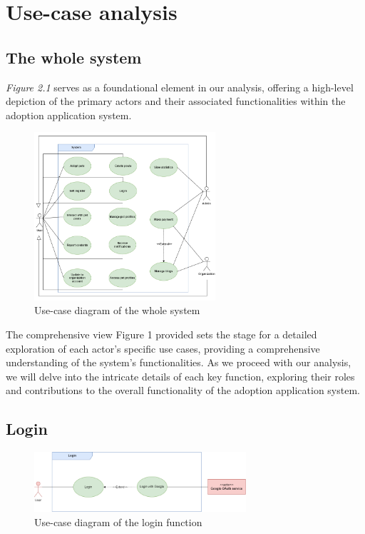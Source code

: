 \section{Use-case analysis}

\subsection{The whole system}

\textit{Figure 2.1} serves as a foundational element in our analysis, offering a high-level depiction of the primary actors and their associated functionalities within the adoption application system.

\begin{figure}[H]
  \centering
  \includegraphics[width=0.6\textwidth]{Figures/system_ucd.png}
  \caption{Use-case diagram of the whole system}
  \label{fig:whole-system_activity_diagram}
\end{figure}

The comprehensive view Figure 1 provided sets the stage for a detailed exploration of each actor's specific use cases, providing a comprehensive understanding of the system's functionalities. As we proceed with our analysis, we will delve into the intricate details of each key function, exploring their roles and contributions to the overall functionality of the adoption application system.

\subsection{Login}

\begin{figure}[H]
  \centering
  \includegraphics[width=0.7\textwidth]{Figures/login_ucd.png}
  \caption{Use-case diagram of the login function}
  \label{fig:login_activity_diagram}
\end{figure}

